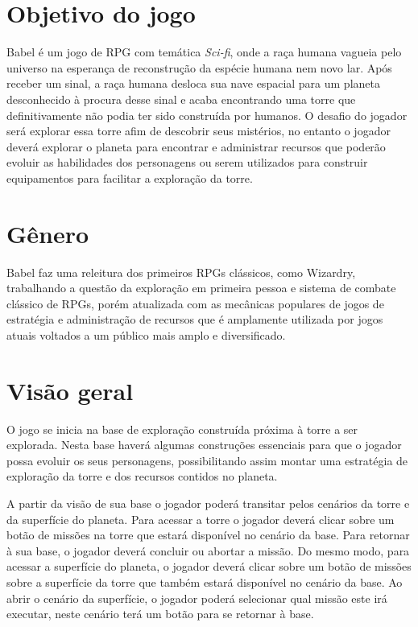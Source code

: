 \documentclass[11pt]{article} %
\begin{document}
\section{Objetivo do jogo}

Babel é um jogo de RPG com temática \textit{Sci-fi}, onde a raça humana vagueia pelo universo na esperança de reconstrução da espécie humana nem novo lar. Após receber um sinal, a raça humana desloca sua nave espacial para um planeta desconhecido à procura desse sinal e acaba encontrando uma torre que definitivamente não podia ter sido construída por humanos. O desafio do jogador será explorar essa torre afim de descobrir seus mistérios, no entanto o jogador deverá explorar o planeta para encontrar e administrar recursos que poderão evoluir as habilidades dos personagens ou serem utilizados para construir equipamentos para facilitar a exploração da torre.

\section{Gênero}

Babel faz uma releitura dos primeiros RPGs clássicos, como Wizardry, trabalhando a questão da exploração em primeira pessoa e sistema de combate clássico de RPGs, porém atualizada com as mecânicas populares de jogos de estratégia e administração de recursos que é amplamente utilizada por jogos atuais voltados a um público mais amplo e diversificado.
 
\section{Visão geral}

O jogo se inicia na base de exploração construída próxima à torre a ser explorada. Nesta base haverá algumas construções essenciais para que o jogador possa evoluir os seus personagens, possibilitando assim montar uma estratégia de exploração da torre e dos recursos contidos no planeta.

A partir da visão de sua base o jogador poderá transitar pelos cenários da torre e da superfície do planeta. Para acessar a torre o jogador deverá clicar sobre um botão de missões na torre que estará disponível no cenário da base. Para retornar à sua base, o jogador deverá concluir ou abortar a missão. Do mesmo modo, para acessar a superfície do planeta, o jogador deverá clicar sobre um botão de missões sobre a superfície da torre que também estará disponível no cenário da base. Ao abrir o cenário da superfície, o jogador poderá selecionar qual missão este irá executar, neste cenário terá um botão para se retornar à base.
\end{document}
